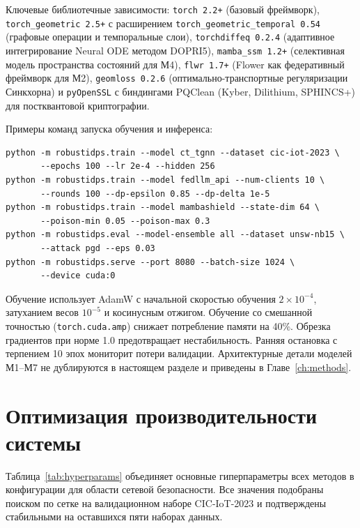 Ключевые библиотечные зависимости: \texttt{torch~2.2+} (базовый фреймворк), \texttt{torch\_geometric~2.5+} с расширением \texttt{torch\_geometric\_temporal~0.54} (графовые операции и темпоральные слои), \texttt{torchdiffeq~0.2.4} (адаптивное интегрирование Neural ODE методом DOPRI5), \texttt{mamba\_ssm~1.2+} (селективная модель пространства состояний для М4), \texttt{flwr~1.7+} (Flower как федеративный фреймворк для М2), \texttt{geomloss~0.2.6} (оптимально-транспортные регуляризации Синкхорна) и \texttt{pyOpenSSL} с биндингами PQClean (Kyber, Dilithium, SPHINCS+) для постквантовой криптографии.

Примеры команд запуска обучения и инференса:
\begin{verbatim}
python -m robustidps.train --model ct_tgnn --dataset cic-iot-2023 \
       --epochs 100 --lr 2e-4 --hidden 256
python -m robustidps.train --model fedllm_api --num-clients 10 \
       --rounds 100 --dp-epsilon 0.85 --dp-delta 1e-5
python -m robustidps.train --model mambashield --state-dim 64 \
       --poison-min 0.05 --poison-max 0.3
python -m robustidps.eval --model-ensemble all --dataset unsw-nb15 \
       --attack pgd --eps 0.03
python -m robustidps.serve --port 8080 --batch-size 1024 \
       --device cuda:0
\end{verbatim}

Обучение использует AdamW с начальной скоростью обучения $2\times10^{-4}$, затуханием весов $10^{-5}$ и косинусным отжигом. Обучение со смешанной точностью (\texttt{torch.cuda.amp}) снижает потребление памяти на 40\%. Обрезка градиентов при норме 1.0 предотвращает нестабильность. Ранняя остановка с терпением 10 эпох мониторит потери валидации. Архитектурные детали моделей М1--М7 не дублируются в настоящем разделе и приведены в Главе~\ref{ch:methods}.

\section{Оптимизация производительности системы}
\label{sec:hyperparams}

Таблица~\ref{tab:hyperparams} объединяет основные гиперпараметры всех методов в конфигурации для области сетевой безопасности. Все значения подобраны поиском по сетке на валидационном наборе CIC-IoT-2023 и подтверждены стабильными на оставшихся пяти наборах данных.

